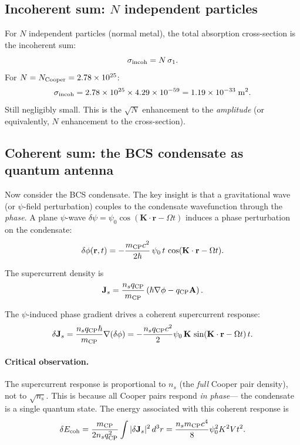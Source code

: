 \documentclass[12pt,aps,prd,twocolumn,superscriptaddress,nofootinbib]{revtex4-2}
\newcommand{\psifield}{\psi}
\newcommand{\ee}[1]{\times 10^{#1}}
\begin{document}
\subsection{Incoherent sum: $N$ independent particles}

For $N$ independent particles (normal metal), the total absorption
cross-section is the incoherent sum:
\begin{equation}\label{eq:sigma-incoh}
\sigma_{\rm incoh} = N\,\sigma_1.
\end{equation}
For $N = N_{\rm Cooper} = 2.78\ee{25}$:
\begin{equation}
\sigma_{\rm incoh} = 2.78\ee{25} \times 4.29\ee{-59}
= 1.19\ee{-33}\;\si{m^2}.
\end{equation}
Still negligibly small. This is the $\sqrt{N}$ enhancement to the
\emph{amplitude} (or equivalently, $N$ enhancement to the cross-section).

\subsection{Coherent sum: the BCS condensate as quantum antenna}
\label{sec:coherent-sum}

Now consider the BCS condensate. The key insight is that a
gravitational wave (or $\psi$-field perturbation) couples to the
condensate wavefunction through the \emph{phase}. A plane $\psi$-wave
$\delta\psifield = \psi_0 \cos(\mathbf{K}\cdot\mathbf{r} - \Omega t)$
induces a phase perturbation on the condensate:
\begin{equation}\label{eq:phase-perturbation}
\delta\phi(\mathbf{r},t) = -\frac{m_{\rm CP}c^2}{2\hbar}\,
\psi_0\,t\,\cos(\mathbf{K}\cdot\mathbf{r} - \Omega t).
\end{equation}

The supercurrent density is
\begin{equation}\label{eq:supercurrent}
\mathbf{J}_s = \frac{n_s q_{\rm CP}}{m_{\rm CP}}
\left(\hbar\nabla\phi - q_{\rm CP}\mathbf{A}\right).
\end{equation}

The $\psi$-induced phase gradient drives a coherent supercurrent
response:
\begin{equation}\label{eq:Js-psi}
\delta\mathbf{J}_s = \frac{n_s q_{\rm CP}\hbar}{m_{\rm CP}}
\nabla(\delta\phi)
= -\frac{n_s q_{\rm CP} c^2}{2}\psi_0\,\mathbf{K}\,
\sin(\mathbf{K}\cdot\mathbf{r} - \Omega t)\,t.
\end{equation}

\paragraph{Critical observation.} The supercurrent response is
proportional to $n_s$ (the \emph{full} Cooper pair density), not to
$\sqrt{n_s}$. This is because all Cooper pairs respond \emph{in phase}---
the condensate is a single quantum state. The energy associated with
this coherent response is
\begin{equation}\label{eq:E-coherent}
\delta E_{\rm coh} = \frac{m_{\rm CP}}{2n_s q_{\rm CP}^2}
\int |\delta\mathbf{J}_s|^2\,d^3r
= \frac{n_s m_{\rm CP}c^4}{8}\psi_0^2 K^2 V t^2.
\end{equation}
\end{document}
